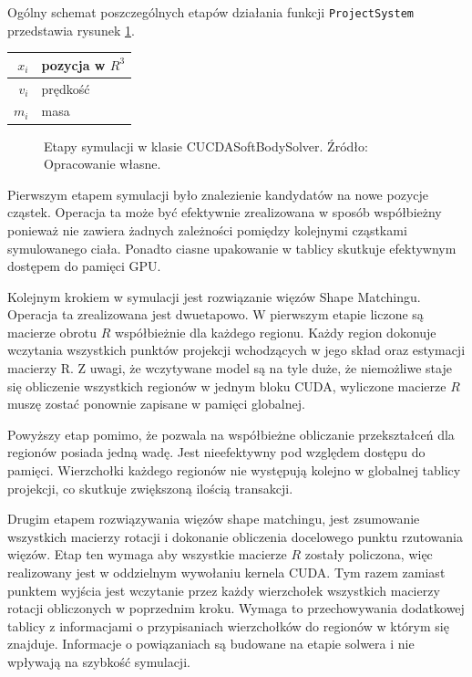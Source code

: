 {Ogólny schemat poszczególnych etapów działania funkcji \texttt{ProjectSystem}
przedstawia rysunek \ref{flow-gpu}.

\centering
\begin{tabular}{|r|l|}
\hline
$x_i$ & pozycja w $R^3$ \\
\hline
$v_i$ & prędkość \\
\hline
$m_i$ & masa\\
\hline
\end{tabular}

\begin{figure}[H]
\centering

\caption{Etapy symulacji w klasie CUCDASoftBodySolver. Źródło: Opracowanie własne.}
\label{flow-gpu}
\end{figure}

Pierwszym etapem symulacji było znalezienie kandydatów na nowe pozycje cząstek.
Operacja ta może być efektywnie zrealizowana w sposób współbieżny ponieważ nie zawiera żadnych
zależności pomiędzy kolejnymi cząstkami symulowanego ciała. Ponadto ciasne
upakowanie w tablicy skutkuje efektywnym dostępem do pamięci GPU.

Kolejnym krokiem w symulacji jest rozwiązanie więzów Shape Matchingu. Operacja
ta zrealizowana jest dwuetapowo. W pierwszym etapie liczone są macierze obrotu
$R$ współbieżnie dla każdego regionu. Każdy region dokonuje wczytania wszystkich
punktów projekcji wchodzących w jego skład oraz estymacji macierzy R. Z uwagi,
że wczytywane model są na tyle duże, że niemożliwe staje się obliczenie
wszystkich regionów w jednym bloku CUDA, wyliczone macierze $R$ muszę zostać
ponownie zapisane w pamięci globalnej.

Powyższy etap pomimo, że pozwala na współbieżne obliczanie przekształceń dla
regionów posiada jedną wadę. Jest nieefektywny pod względem dostępu do pamięci.
Wierzchołki każdego regionów nie występują kolejno w globalnej tablicy
projekcji, co skutkuje zwiększoną ilością transakcji.

Drugim etapem rozwiązywania więzów shape matchingu, jest zsumowanie wszystkich
macierzy rotacji i dokonanie obliczenia docelowego punktu rzutowania więzów. Etap
ten wymaga aby wszystkie macierze $R$ zostały policzona, więc realizowany jest w
oddzielnym wywołaniu kernela CUDA. Tym razem zamiast punktem wyjścia jest
wczytanie przez każdy wierzchołek wszystkich macierzy rotacji obliczonych w
poprzednim kroku. Wymaga to przechowywania dodatkowej tablicy z informacjami o 
przypisaniach wierzchołków do regionów w którym się znajduje. Informacje o
powiązaniach są budowane na etapie solwera i nie wpływają na szybkość symulacji.

}
